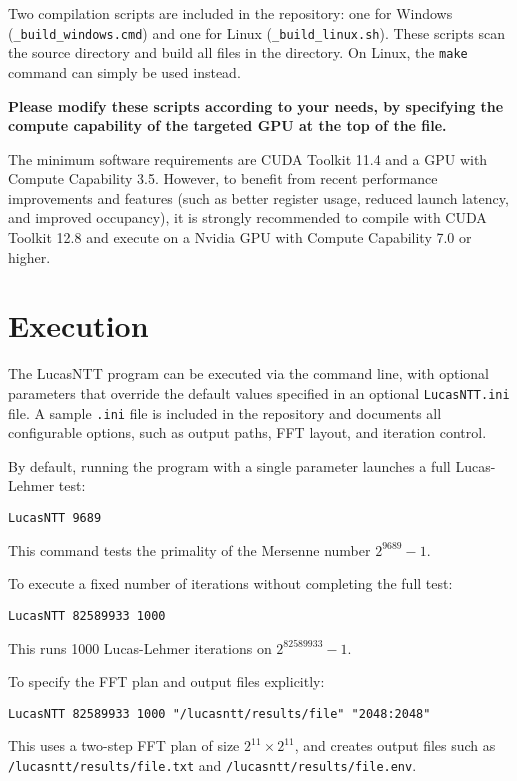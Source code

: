 \documentclass{article}
\begin{document}
Two compilation scripts are included in the repository: one for Windows (\texttt{\_build\_windows.cmd}) and one for Linux (\texttt{\_build\_linux.sh}). These scripts scan the source directory and build all files in the directory. On Linux, the \texttt{make} command can simply be used instead. 

\textbf{Please modify these scripts according to your needs, by specifying the compute capability of the targeted GPU at the top of the file.}

The minimum software requirements are CUDA Toolkit 11.4 and a GPU with Compute Capability 3.5. 
However, to benefit from recent performance improvements and features (such as better register usage, reduced launch latency, and improved occupancy), it is strongly recommended to compile with CUDA Toolkit 12.8 and execute on a Nvidia GPU with Compute Capability 7.0 or higher.

\section{Execution}

The LucasNTT program can be executed via the command line, with optional parameters that override the default values specified in an optional \texttt{LucasNTT.ini} file. A sample \texttt{.ini} file is included in the repository and documents all configurable options, such as output paths, FFT layout, and iteration control.

\newpage
By default, running the program with a single parameter launches a full Lucas-Lehmer test:
\begin{verbatim}
LucasNTT 9689
\end{verbatim}
This command tests the primality of the Mersenne number $2^{9689} - 1$.

To execute a fixed number of iterations without completing the full test:
\begin{verbatim}
LucasNTT 82589933 1000
\end{verbatim}
This runs 1000 Lucas-Lehmer iterations on $2^{82589933} - 1$.

To specify the FFT plan and output files explicitly:
\begin{verbatim}
LucasNTT 82589933 1000 "/lucasntt/results/file" "2048:2048"
\end{verbatim}
This uses a two-step FFT plan of size $2^{11} \times 2^{11}$, and creates output files such as  \texttt{/lucasntt/results/file.txt} and \texttt{/lucasntt/results/file.env}.
\end{document}
